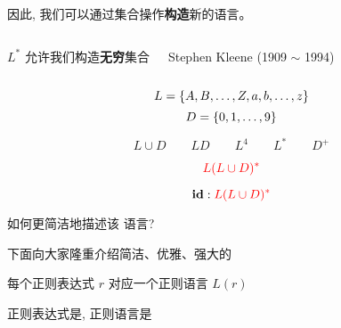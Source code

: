 \begin{frame}{}
  \begin{center}

    \vspace{0.80cm}
    因此, 我们可以通过集合操作{\bf 构造}新的语言。
  \end{center}
\end{frame}

\begin{frame}{}
  \begin{columns}

      \begin{center}
        $L^{\ast}$ 允许我们构造{\bf 无穷}集合
      \end{center}
      \begin{center}
        Stephen Kleene (1909 $\sim$ 1994)
      \end{center}
  \end{columns}
\end{frame}

\begin{frame}{}
  \[
    L = \{A, B, \dots, Z, a, b, \dots, z\}
  \]
  \[
    D = \{0, 1, \dots, 9\}
  \]

  \pause
  \[
    L \cup D \qquad LD \qquad L^4 \qquad L^{\ast} \qquad D^{+}
  \]

  \[
    \textcolor{red}{L(L \cup D)^{\ast}}
  \]
\end{frame}

\begin{frame}{}
  \[
    \text{\bf id}: \textcolor{red}{L(L \cup D)^{\ast}}
  \]
  
  \begin{center}
    如何更简洁地描述该 \id{} 语言?
  \end{center}

  \pause
  \begin{center}
    下面向大家隆重介绍简洁、优雅、强大的
  \end{center}
\end{frame}

\begin{frame}{}
  \begin{center}
    每个正则表达式 $r$ 对应一个正则语言 $L(r)$

    \vspace{0.30cm}

    \vspace{0.30cm}
    正则表达式是, 正则语言是
  \end{center}
\end{frame}

